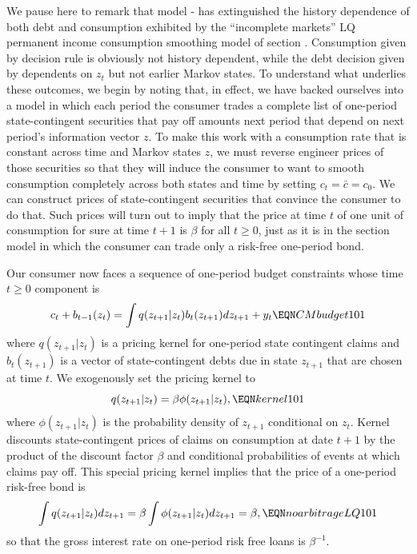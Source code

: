 We pause here to remark that model - has extinguished the history dependence of both debt and consumption exhibited by 
the ``incomplete markets'' LQ permanent income consumption smoothing model of section .  Consumption given by decision rule
  is obviously not history dependent, while the debt decision given by  dependents on $z_t$ but not earlier 
Markov states. To understand what underlies  these outcomes,  we begin by noting that, 
%
in effect,  we have backed ourselves into  a model in which each period the consumer  trades a complete
list of one-period state-contingent securities that  pay off amounts next period that depend on next period's information vector $z$.
  To make this work with a consumption rate that is constant across time and Markov states $z$, we must reverse engineer prices of those securities
  so that they will  induce the consumer to want to smooth consumption completely
across both states and time by setting $c_t = \bar c = c_0$.
We can construct   prices of state-contingent securities that convince the consumer to do that.
Such  prices will turn out to  imply that the price at time $t$ of one unit of consumption for sure at time $t+1$ is $\beta$ for all $t \geq 0$, just as it is in the section   model  in which
the consumer can trade only a risk-free one-period bond.


Our consumer now faces a sequence of one-period budget constraints whose time $t \geq 0$ component is
$$ c_t + b_{t-1}(z_t) = \int  q(z_{t+1} | z_t ) b_t(z_{t+1}) d z_{t+1} + y_t  \EQN CMbudget101 $$
where $q(z_{t+1} | z_t)$ is a pricing kernel for one-period  state contingent claims and $b_t(z_{t+1})$ is   a vector of state-contingent debts due in state $z_{t+1}$
 that are chosen at time $t$.
We exogenously set the pricing kernel to
$$ q(z_{t+1} | z_t ) = \beta \phi(z_{t+1} | z_t) , \EQN kernel101 $$
where $\phi(z_{t+1} | z_t)$ is the probability density of $z_{t+1}$ conditional on $z_t$.  Kernel  discounts state-contingent prices
of claims on consumption at date $t+1$ by the product of the discount factor $\beta$ and  conditional probabilities of   events
at which  claims pay off. This special   pricing kernel
implies that the price of a one-period risk-free bond is
$$ \int q(z_{t+1} | z_t) d z_{t+1} = \beta \int \phi(z_{t+1} | z_t) d z_{t+1} = \beta,  \EQN noarbitrageLQ101 $$
so that the gross interest rate on one-period risk free loans is  $\beta^{-1}$.

